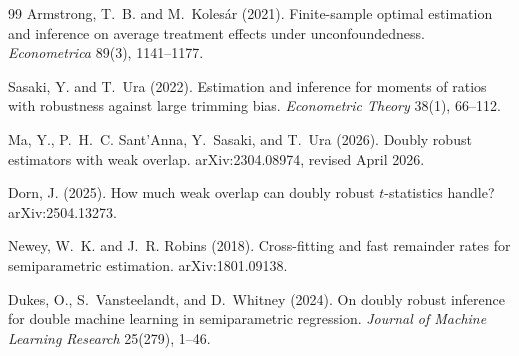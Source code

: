 \documentclass[11pt]{article}
\theoremstyle{definition}
\theoremstyle{plain}
\theoremstyle{remark}
\begin{document}
\begin{thebibliography}{99}
Armstrong, T.~B. and M.~Koles{\'a}r (2021).
\newblock Finite-sample optimal estimation and inference on average treatment effects under unconfoundedness.
\newblock \emph{Econometrica} 89(3), 1141--1177.

Sasaki, Y. and T.~Ura (2022).
\newblock Estimation and inference for moments of ratios with robustness against large trimming bias.
\newblock \emph{Econometric Theory} 38(1), 66--112.

Ma, Y., P.~H.~C. Sant'Anna, Y.~Sasaki, and T.~Ura (2026).
\newblock Doubly robust estimators with weak overlap.
\newblock arXiv:2304.08974, revised April 2026.

Dorn, J. (2025).
\newblock How much weak overlap can doubly robust \(t\)-statistics handle?
\newblock arXiv:2504.13273.

Newey, W.~K. and J.~R. Robins (2018).
\newblock Cross-fitting and fast remainder rates for semiparametric estimation.
\newblock arXiv:1801.09138.

Dukes, O., S.~Vansteelandt, and D.~Whitney (2024).
\newblock On doubly robust inference for double machine learning in semiparametric regression.
\newblock \emph{Journal of Machine Learning Research} 25(279), 1--46.
\end{thebibliography}
\end{document}
